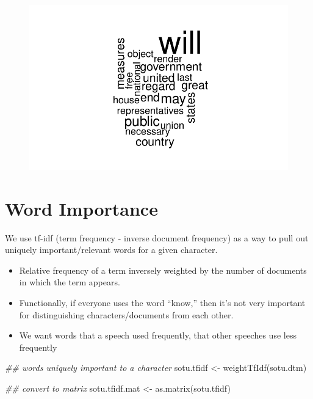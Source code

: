 \documentclass[
  letterpaper,
  DIV=11,
  numbers=noendperiod]{scrreprt}
\newenvironment{Shaded}{\begin{snugshade}}{\end{snugshade}}
\newcommand{\DocumentationTok}[1]{\textcolor[rgb]{0.37,0.37,0.37}{\textit{#1}}}
\newcommand{\FunctionTok}[1]{\textcolor[rgb]{0.28,0.35,0.67}{#1}}
\newcommand{\NormalTok}[1]{\textcolor[rgb]{0.00,0.23,0.31}{#1}}
\newcommand{\OtherTok}[1]{\textcolor[rgb]{0.00,0.23,0.31}{#1}}
\providecommand{\tightlist}{%
  \setlength{\itemsep}{0pt}\setlength{\parskip}{0pt}}\usepackage{longtable,booktabs,array}
\begin{document}
\begin{figure}[H]

{\centering \includegraphics{11-TextasData_files/figure-pdf/unnamed-chunk-11-1.pdf}

}

\end{figure}

\hypertarget{word-importance}{%
\section{Word Importance}\label{word-importance}}

We use tf-idf (term frequency - inverse document frequency) as a way to
pull out uniquely important/relevant words for a given character.

\begin{itemize}
\tightlist
\item
  Relative frequency of a term inversely weighted by the number of
  documents in which the term appears.
\item
  Functionally, if everyone uses the word ``know,'' then it's not very
  important for distinguishing characters/documents from each other.
\item
  We want words that a speech used frequently, that other speeches use
  less frequently
\end{itemize}

\begin{Shaded}
\begin{Highlighting}[]
\DocumentationTok{\#\# words uniquely important to a character}
\NormalTok{sotu.tfidf }\OtherTok{\textless{}{-}} \FunctionTok{weightTfIdf}\NormalTok{(sotu.dtm)}

\DocumentationTok{\#\# convert to matrix}
\NormalTok{sotu.tfidf.mat }\OtherTok{\textless{}{-}} \FunctionTok{as.matrix}\NormalTok{(sotu.tfidf)}
\end{Highlighting}
\end{Shaded}
\end{document}
